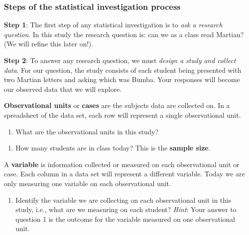 \documentclass[
]{report}
\providecommand{\tightlist}{%
  \setlength{\itemsep}{0pt}\setlength{\parskip}{0pt}}
\begin{document}
\vspace{1mm}

\hypertarget{steps-of-the-statistical-investigation-process}{%
\subsubsection*{Steps of the statistical investigation process}\label{steps-of-the-statistical-investigation-process}}

\textbf{Step 1}: The first step of any statistical investigation is to \emph{ask a research question}. In this study the research question is: can we as a class read Martian? (We will refine this later on!).

\textbf{Step 2}: To answer any research question, we must \emph{design a study and collect data}. For our question, the study consists of each student being presented with two Martian letters and asking which was Bumba. Your responses will become our observed data that we will explore.

\textbf{Observational units} or \textbf{cases} are the subjects data are collected on. In a spreadsheet of the data set, each row will represent a single observational unit.

\begin{enumerate}
\def\labelenumi{\arabic{enumi}.}
\setcounter{enumi}{1}
\tightlist
\item
  What are the observational units in this study?
\end{enumerate}

\vspace{0.2in}

\begin{enumerate}
\def\labelenumi{\arabic{enumi}.}
\setcounter{enumi}{2}
\tightlist
\item
  How many students are in class today? This is the \textbf{sample size}.
\end{enumerate}

\vspace{0.2in}

A \textbf{variable} is information collected or measured on each observational unit or case. Each column in a data set will represent a different variable. Today we are only measuring one variable on each observational unit.

\begin{enumerate}
\def\labelenumi{\arabic{enumi}.}
\setcounter{enumi}{3}
\tightlist
\item
  Identify the variable we are collecting on each observational unit in this study, i.e., what are we measuring on each student? \emph{Hint}: Your answer to question 1 is the outcome for the variable measured on one observational unit.
\end{enumerate}
\end{document}
